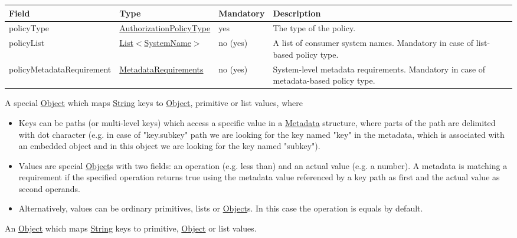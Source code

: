 \documentclass[a4paper]{arrowhead}
\newcommand{\pref}[1]{{\textcolor{ArrowheadGrey}{\hyperref[sec:model:primitives:#1]{#1}}}}
\begin{document}
\clearpage


\begin{table}[ht!]
\begin{tabularx}{\textwidth}{| p{4.3cm} | p{4.1cm} | p{2cm} | X |} \hline
\rowcolor{gray!33} Field & Type & Mandatory & Description \\ \hline
policyType & \pref{AuthorizationPolicyType} & yes & The type of the policy. \\ \hline
policyList & \pref{List}$<$\pref{SystemName}$>$ & no (yes) & A list of consumer system names. Mandatory in case of list-based policy type. \\ \hline
policyMetadataRequirement & \hyperref[sec:model:MetadataRequirements]{MetadataRequirements} & no (yes) & System-level metadata requirements. Mandatory in case of metadata-based policy type. \\ \hline 
\end{tabularx}
\end{table}


A special \pref{Object} which maps \pref{String} keys to \pref{Object}, primitive or list values, where 

\begin{itemize}
    \item Keys can be paths (or multi-level keys) which access a specific value in a \hyperref[sec:model:Metadata]{Metadata} structure, where parts of the path are delimited with dot character (e.g. in case of "key.subkey" path we are looking for the key named "key" in the metadata, which is associated with an embedded object and in this object we are looking for the key named "subkey").
    \item Values are special \pref{Object}s with two fields: an operation (e.g. less than) and an actual value (e.g. a number). A metadata is matching a requirement if the specified operation returns true using the metadata value referenced by a key path as first and the actual value as second operands. 
    \item Alternatively, values can be ordinary primitives, lists or \pref{Object}s. In this case the operation is equals by default.
\end{itemize}


An \pref{Object} which maps \pref{String} keys to primitive, \pref{Object} or list values.
\end{document}
